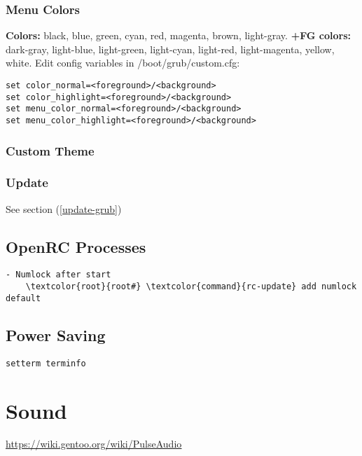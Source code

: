 \documentclass[10pt, a4paper, onecolumn, openany]{book}         %
\begin{document}
\subsection{Menu Colors}
\textbf{Colors:} black, blue, green, cyan, red, magenta, brown, light-gray.\newline
\textbf{+FG colors:} dark-gray, light-blue, light-green, light-cyan, light-red, light-magenta, yellow, white.\newline
Edit config variables in \textcolor{file}{/boot/grub/custom.cfg}:
\begin{Verbatim}[commandchars=\\\{\}]
set color_normal=<foreground>/<background>
set color_highlight=<foreground>/<background>
set menu_color_normal=<foreground>/<background>
set menu_color_highlight=<foreground>/<background>
\end{Verbatim}

\subsection{Custom Theme}

\subsection{Update}
See section (\underline{\ref{update-grub}})

\section{OpenRC Processes}
\begin{Verbatim}[commandchars=\\\{\}]
- Numlock after start
    \textcolor{root}{root#} \textcolor{command}{rc-update} add numlock default
\end{Verbatim}


\section{Power Saving}
\begin{Verbatim}[commandchars=\\\{\}]
setterm terminfo
\end{Verbatim}



\chapter{Sound}
\underline{\url{https://wiki.gentoo.org/wiki/PulseAudio}}\newline
\end{document}
